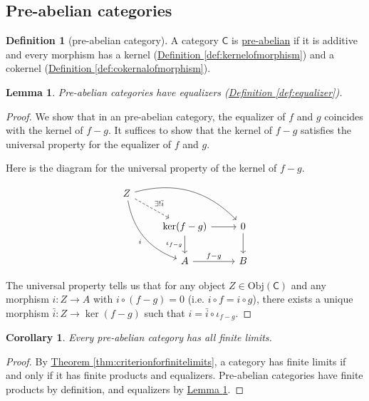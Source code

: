 \documentclass[a4paper]{report}
\newcommand{\defn}[1]{\ul{#1}}
\newcommand{\Obj}{\mathrm{Obj}}
\theoremstyle{definition}
\newtheorem{definition}{Definition}[section]
\theoremstyle{plain}
\newtheorem{lemma}{Lemma}[section]
\newtheorem{corollary}{Corollary}[section]
\theoremstyle{remark}
\begin{document}
\subsection{Pre-abelian categories} \label{sec:preabeliancategories}
\begin{definition}[pre-abelian category]
  \label{def:preabeliancategory}
  A category  $\mathsf{C}$ is \defn{pre-abelian} if it is additive and every morphism has a kernel (\hyperref[def:kernelofmorphism]{Definition \ref*{def:kernelofmorphism}}) and a cokernel (\hyperref[def:cokernalofmorphism]{Definition \ref*{def:cokernalofmorphism}}).
\end{definition}

\begin{lemma}
  \label{lemma:preabeliancategorieshaveequalizers}
  Pre-abelian categories have equalizers (\hyperref[def:equalizer]{Definition \ref*{def:equalizer}}).
\end{lemma}
\begin{proof}
  We show that in an pre-abelian category, the equalizer of $f$ and $g$ coincides with the kernel of $f - g$. It suffices to show that the kernel of $f - g$ satisfies the universal property for the equalizer of $f$ and $g$.

  Here is the diagram for the universal property of the kernel of $f - g$.
  \begin{equation*}
    \begin{tikzcd}
      Z
      \arrow[rrd, bend left]
      \arrow[ddr, bend right, swap, "i"]
      \arrow[dr, dashed, "\exists!\bar{i}"]
      \\
      & \ker(f - g)
      \arrow[d, swap, "\iota_{f - g}"]
      \arrow[r]
      & 0
      \arrow[d]
      \\
      & A
      \arrow[r, "f - g"]
      & B
    \end{tikzcd}
  \end{equation*}

  The universal property tells us that for any object $Z \in \Obj(\mathsf{C})$ and any morphism $i\colon Z \to A$ with $i \circ (f - g) = 0$ (i.e. $i \circ f = i \circ g$), there exists a unique morphism $\bar{i}\colon Z \to \ker(f - g)$ such that $i = \bar{i} \circ \iota_{f - g}$.
\end{proof}

\begin{corollary}
  Every pre-abelian category has all finite limits.
\end{corollary}
\begin{proof}
  By \hyperref[thm:criterionforfinitelimits]{Theorem \ref*{thm:criterionforfinitelimits}}, a category has finite limits if and only if it has finite products and equalizers. Pre-abelian categories have finite products by definition, and equalizers by \hyperref[lemma:preabeliancategorieshaveequalizers]{Lemma \ref*{lemma:preabeliancategorieshaveequalizers}}.
\end{proof}
\end{document}
